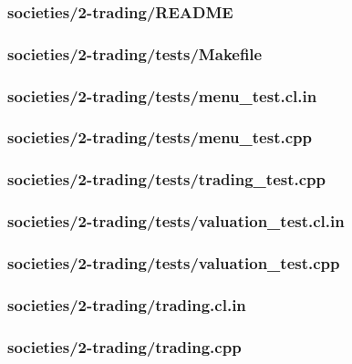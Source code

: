 \documentclass{article}
\begin{document}
\subsubsection*{societies/2-trading/README}


\subsubsection*{societies/2-trading/tests/Makefile}


\subsubsection*{societies/2-trading/tests/menu\_test.cl.in}


\subsubsection*{societies/2-trading/tests/menu\_test.cpp}


\subsubsection*{societies/2-trading/tests/trading\_test.cpp}


\subsubsection*{societies/2-trading/tests/valuation\_test.cl.in}


\subsubsection*{societies/2-trading/tests/valuation\_test.cpp}


\subsubsection*{societies/2-trading/trading.cl.in}


\subsubsection*{societies/2-trading/trading.cpp}

\end{document}

